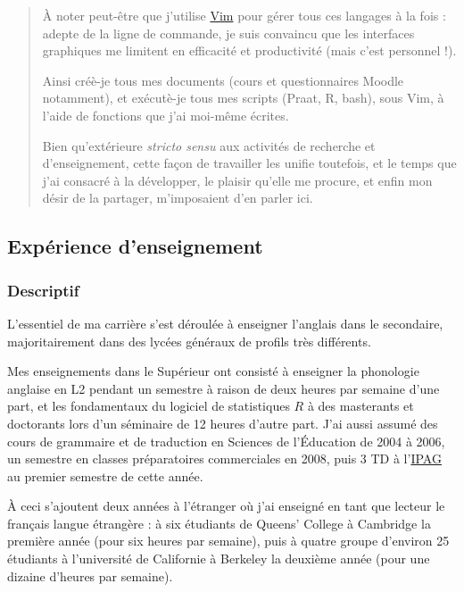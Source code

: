 \documentclass[
  10pt,
]{article}
\begin{document}
\begin{quote}
À noter peut-être que j'utilise \href{https://www.vim.org}{Vim} pour gérer tous ces langages à la fois : adepte de la ligne de commande,
je suis convaincu que les interfaces graphiques me limitent en efficacité et productivité (mais c'est personnel !).

Ainsi créè-je tous mes documents (cours et questionnaires Moodle notamment), et exécutè-je tous mes scripts (Praat, R, bash), sous Vim, à l'aide de fonctions que j'ai moi-même écrites.

Bien qu'extérieure \emph{stricto sensu} aux activités de recherche et d'enseignement, cette façon de travailler les unifie toutefois, et le temps que j'ai consacré à la développer,
le plaisir qu'elle me procure, et enfin mon désir de la partager, m'imposaient d'en parler ici.
\end{quote}

\pagebreak

\hypertarget{expuxe9rience-denseignement}{%
\subsection{Expérience d'enseignement}\label{expuxe9rience-denseignement}}

\hypertarget{descriptif}{%
\subsubsection{Descriptif}\label{descriptif}}

L'essentiel de ma carrière s'est déroulée à enseigner l'anglais dans le secondaire, majoritairement
dans des lycées généraux de profils très différents.

Mes enseignements dans le Supérieur ont consisté à enseigner la phonologie anglaise en L2
pendant un semestre à raison de deux heures par semaine d'une part, et les fondamentaux du
logiciel de statistiques \(R\) à des masterants et doctorants lors d'un séminaire de 12 heures d'autre
part. J'ai aussi assumé des cours de grammaire et de traduction en Sciences de l'Éducation de 2004 à 2006, un semestre en classes préparatoires commerciales en 2008, puis 3 TD à l'\href{https://www.ipag.edu/en}{IPAG} au premier semestre de cette année.

À ceci s'ajoutent deux années à l'étranger où j'ai enseigné en tant que lecteur le français langue
étrangère : à six étudiants de Queens' College à Cambridge la première année (pour six heures
par semaine), puis à quatre groupe d'environ 25 étudiants à l'université de Californie à Berkeley la
deuxième année (pour une dizaine d'heures par semaine).
\end{document}
